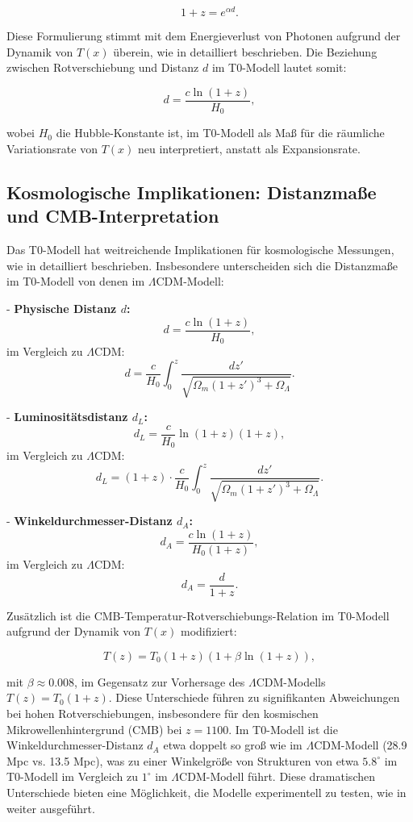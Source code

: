 \documentclass[a4paper,12pt]{article}
\newcommand{\Tfield}{T(x)}
\begin{document}
	\begin{equation}
		1 + z = e^{\alpha d}.
	\end{equation}
	
	Diese Formulierung stimmt mit dem Energieverlust von Photonen aufgrund der Dynamik von \( \Tfield \) überein, wie in \cite{pascher_messdifferenzen_2025} detailliert beschrieben. Die Beziehung zwischen Rotverschiebung und Distanz \( d \) im T0-Modell lautet somit:
	
	\begin{equation}
		d = \frac{c \ln(1 + z)}{H_0},
	\end{equation}
	
	wobei \( H_0 \) die Hubble-Konstante ist, im T0-Modell als Maß für die räumliche Variationsrate von \( \Tfield \) neu interpretiert, anstatt als Expansionsrate.
	
	\subsection{Kosmologische Implikationen: Distanzmaße und CMB-Interpretation}
	
	Das T0-Modell hat weitreichende Implikationen für kosmologische Messungen, wie in \cite{pascher_messdifferenzen_2025} detailliert beschrieben. Insbesondere unterscheiden sich die Distanzmaße im T0-Modell von denen im \(\Lambda\)CDM-Modell:
	
	- \textbf{Physische Distanz \( d \):}
	\[
	d = \frac{c \ln(1 + z)}{H_0},
	\]
	im Vergleich zu \(\Lambda\)CDM:
	\[
	d = \frac{c}{H_0} \int_0^z \frac{dz'}{\sqrt{\Omega_m (1 + z')^3 + \Omega_\Lambda}}.
	\]
	
	- \textbf{Luminositätsdistanz \( d_L \):}
	\[
	d_L = \frac{c}{H_0} \ln(1 + z) (1 + z),
	\]
	im Vergleich zu \(\Lambda\)CDM:
	\[
	d_L = (1 + z) \cdot \frac{c}{H_0} \int_0^z \frac{dz'}{\sqrt{\Omega_m (1 + z')^3 + \Omega_\Lambda}}.
	\]
	
	- \textbf{Winkeldurchmesser-Distanz \( d_A \):}
	\[
	d_A = \frac{c \ln(1 + z)}{H_0 (1 + z)},
	\]
	im Vergleich zu \(\Lambda\)CDM:
	\[
	d_A = \frac{d}{1 + z}.
	\]
	
	Zusätzlich ist die CMB-Temperatur-Rotverschiebungs-Relation im T0-Modell aufgrund der Dynamik von \( \Tfield \) modifiziert:
	
	\begin{equation}
		T(z) = T_0 (1 + z) (1 + \beta \ln(1 + z)),
	\end{equation}
	
	mit \( \beta \approx 0.008 \), im Gegensatz zur Vorhersage des \(\Lambda\)CDM-Modells \( T(z) = T_0 (1 + z) \). Diese Unterschiede führen zu signifikanten Abweichungen bei hohen Rotverschiebungen, insbesondere für den kosmischen Mikrowellenhintergrund (CMB) bei \( z = 1100 \). Im T0-Modell ist die Winkeldurchmesser-Distanz \( d_A \) etwa doppelt so groß wie im \(\Lambda\)CDM-Modell (28.9 Mpc vs. 13.5 Mpc), was zu einer Winkelgröße von Strukturen von etwa \( 5.8^\circ \) im T0-Modell im Vergleich zu \( 1^\circ \) im \(\Lambda\)CDM-Modell führt. Diese dramatischen Unterschiede bieten eine Möglichkeit, die Modelle experimentell zu testen, wie in \cite{pascher_messdifferenzen_2025} weiter ausgeführt.
	
\end{document}
